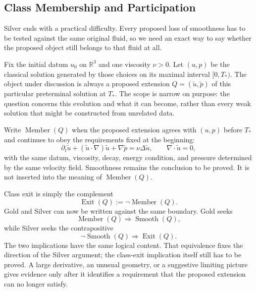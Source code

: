 \subsection{Class Membership and Participation}\label{sub:ClassMembershipAndParticipation}

Silver ends with a practical difficulty.
Every proposed loss of smoothness has to be tested against the same original fluid, so we need an exact way to say whether the proposed object still belongs to that fluid at all.

Fix the initial datum \(u_0\) on \(\mathbb R^3\) and one viscosity \(\nu>0\).
Let \((u,p)\) be the classical solution generated by those choices on its maximal interval \([0,T_*)\).
The object under discussion is always a proposed extension \(Q=(\widetilde u,\widetilde p)\) of this particular preterminal solution at \(T_*\).
The scope is narrow on purpose: the question concerns this evolution and what it can become, rather than every weak solution that might be constructed from unrelated data.

Write \(\operatorname{Member}(Q)\) when the proposed extension agrees with \((u,p)\) before \(T_*\) and continues to obey the requirements fixed at the beginning:
\[
  \partial_t\widetilde u
  +(\widetilde u\cdot\nabla)\widetilde u
  +\nabla\widetilde p
  =
  \nu\Delta\widetilde u,
  \qquad
  \nabla\cdot\widetilde u=0,
\]
with the same datum, viscosity, decay, energy condition, and pressure determined by the same velocity field.
Smoothness remains the conclusion to be proved.
It is not inserted into the meaning of \(\operatorname{Member}(Q)\).

Class exit is simply the complement
\[
  \operatorname{Exit}(Q)
  :=
  \neg\operatorname{Member}(Q).
\]
Gold and Silver can now be written against the same boundary.
Gold seeks
\[
  \operatorname{Member}(Q)
  \Longrightarrow
  \operatorname{Smooth}(Q),
\]
while Silver seeks the contrapositive
\[
  \neg\operatorname{Smooth}(Q)
  \Longrightarrow
  \operatorname{Exit}(Q).
\]
The two implications have the same logical content.
That equivalence fixes the direction of the Silver argument; the class-exit implication itself still has to be proved.
A large derivative, an unusual geometry, or a suggestive limiting picture gives evidence only after it identifies a requirement that the proposed extension can no longer satisfy.

